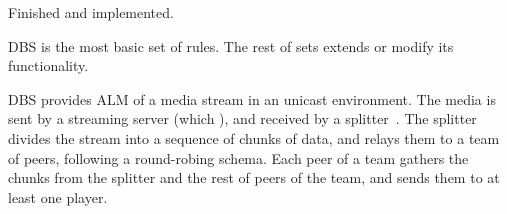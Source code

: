 
\label{sec:DBS}

\begin{notex}
  Finished and implemented.
\end{notex}

\acrshort{DBS} is the most basic set of rules. The rest of sets extends or modify
its functionality.

DBS provides \acrshort{ALM} of a \gls{media} \gls{stream} in an
\gls{unicast} environment. The media is sent by a streaming
\gls{server} (which ), and  received by a \gls{splitter}~. The splitter divides
the stream into a sequence of \gls{chunk}s of data, and relays them to
a \gls{team} of peers, following a round-robing schema. Each peer of a
team gathers the chunks from the splitter and the rest of peers of the
team, and sends them to at least one \gls{player}.

\begin{comment}
In single layered streams\footnote{Each layer of a
  scalable stream is received by a different peer attached to the same
  player capable or render scalable media.}, each peer is spawned by a
player (normal users should not run peers directly).
\end{comment}

\begin{comment}
/* quitar: We define the set of teams as
$\{T\}$,
and enumerate the peers in the team $T$ as $T=\{P_1,\cdots,P_{|T|}\}$. */
\end{comment}
